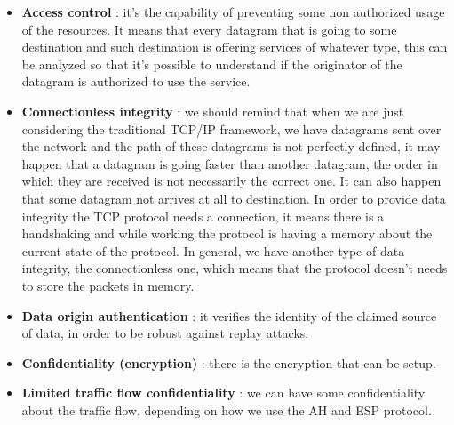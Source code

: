 \documentclass[11pt]{article}
\begin{document}
\begin{itemize}
\item \textbf{Access control} : it's the capability of preventing some non authorized usage of the resources. It means that every datagram that is going to some destination and such destination is offering services of whatever type, this can be analyzed so that it's possible to understand if the originator of the datagram is authorized to use the service.
\item \textbf{Connectionless integrity} : we should remind that when we are just considering the traditional TCP/IP framework, we have datagrams sent over the network and the path of these datagrams is not perfectly defined, it may happen that a datagram is going faster than another datagram, the order in which they are received is not necessarily the correct one. It can also happen that some datagram not arrives at all to destination. In order to provide data integrity the TCP protocol needs a connection, it means there is a handshaking and while working the protocol is having a memory about the current state of the protocol. In general, we have another type of data integrity, the connectionless one, which means that the protocol doesn't needs to store the packets in memory.
\item \textbf{Data origin authentication} : it verifies the identity of the claimed source of data, in order to be robust against replay attacks.
\item \textbf{Confidentiality (encryption)} : there is the encryption that can be setup.
\item \textbf{Limited traffic flow confidentiality} : we can have some confidentiality about the traffic flow, depending on how we use the AH and ESP protocol.
\end{itemize}
\end{document}
